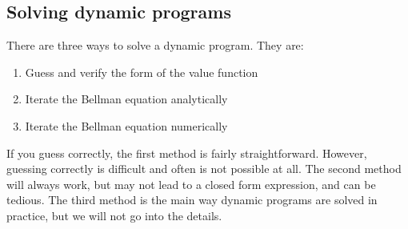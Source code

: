 \subsection{Solving dynamic programs} 

There are three ways to solve a dynamic program. They are:
\begin{enumerate}
\item Guess and verify the form of the value function
\item Iterate the Bellman equation analytically
\item Iterate the Bellman equation numerically
\end{enumerate}
If you guess correctly, the first method is fairly
straightforward. However, guessing correctly is difficult and often is
not possible at all. The second method will always work, but may not
lead to a closed form expression, and can be tedious. The third method
is the main way dynamic programs are solved in practice, but we will
not go into the details.

